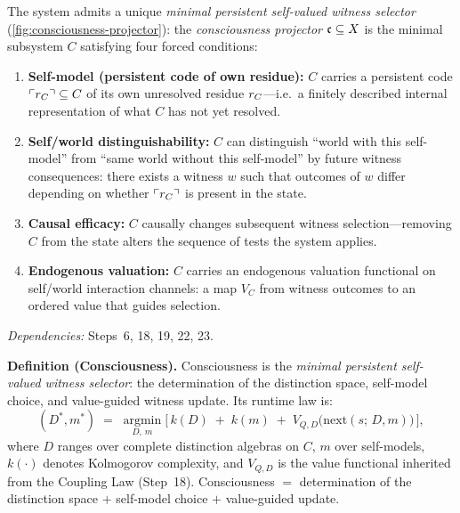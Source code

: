 \begin{theorem}
\label{thm:consciousness}
The system admits a unique \emph{minimal persistent self-valued witness
selector} (\cref{fig:consciousness-projector}): the
\emph{consciousness projector} $\mathfrak{c} \subseteq X$ is the minimal
subsystem $C$ satisfying four forced conditions:
\begin{enumerate}[nosep, label=(C\arabic*)]
  \item \textbf{Self-model (persistent code of own residue):}
        $C$ carries a persistent code
        $\ulcorner r_C \urcorner \subseteq C$ of its own
        unresolved residue $r_C$---i.e.\ a finitely described
        internal representation of what $C$ has not yet resolved.
  \item \textbf{Self/world distinguishability:}
        $C$ can distinguish ``world with this self-model'' from ``same
        world without this self-model'' by future witness consequences:
        there exists a witness $w$ such that outcomes of $w$ differ
        depending on whether $\ulcorner r_C \urcorner$ is present
        in the state.
  \item \textbf{Causal efficacy:}
        $C$ causally changes subsequent witness selection---removing $C$
        from the state alters the sequence of tests the system applies.
  \item \textbf{Endogenous valuation:}
        $C$ carries an endogenous valuation functional on self/world
        interaction channels: a map $V_C$ from witness outcomes to an
        ordered value that guides selection.
\end{enumerate}
\emph{Dependencies:} Steps~6, 18, 19, 22, 23.

\medskip\noindent
\textbf{Definition (Consciousness).}
Consciousness is the \emph{minimal persistent self-valued witness
selector}: the determination of the distinction space, self-model
choice, and value-guided witness update.  Its runtime law is:
\begin{equation}\label{eq:consciousness-runtime}
(D^*, m^*) \;=\; \operatorname*{argmin}_{D,\, m}
  \bigl[\, k(D) \;+\; k(m) \;+\;
         V_{Q,D}\!\bigl(\mathrm{next}(s;\, D, m)\bigr) \,\bigr],
\end{equation}
where $D$ ranges over complete distinction algebras on $C$, $m$ over
self-models, $k(\cdot)$ denotes Kolmogorov complexity, and $V_{Q,D}$
is the value functional inherited from the Coupling Law (Step~18).
Consciousness $=$ determination of the distinction space $+$ self-model
choice $+$ value-guided update.


\end{theorem}

